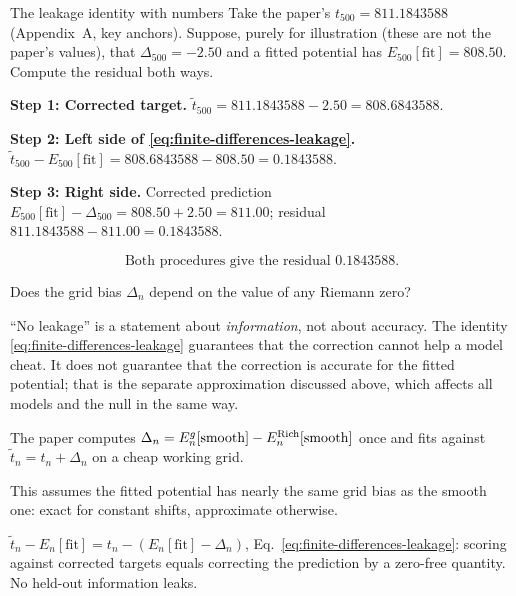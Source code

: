 \begin{sample}{The leakage identity with numbers}
Take the paper's $t_{500}=811.1843588$ (Appendix~A, key anchors). Suppose, purely for illustration (these are not the paper's values), that $\Delta_{500}=-2.50$ and a fitted potential has $E_{500}[\mathrm{fit}]=808.50$. Compute the residual both ways.

\textbf{Step 1: Corrected target.} $\tilde t_{500}=811.1843588-2.50=808.6843588$.

\textbf{Step 2: Left side of \eqref{eq:finite-differences-leakage}.} $\tilde t_{500}-E_{500}[\mathrm{fit}]=808.6843588-808.50=0.1843588$.

\textbf{Step 3: Right side.} Corrected prediction $E_{500}[\mathrm{fit}]-\Delta_{500}=808.50+2.50=811.00$; residual $811.1843588-811.00=0.1843588$.

\begin{equation*}
\boxed{\text{Both procedures give the residual }0.1843588.}
\end{equation*}
\end{sample}

\begin{checkpoint}
Does the grid bias $\Delta_n$ depend on the value of any Riemann zero?
\end{checkpoint}

\begin{pitfall}
``No leakage'' is a statement about \emph{information}, not about accuracy. The identity \eqref{eq:finite-differences-leakage} guarantees that the correction cannot help a model cheat. It does not guarantee that the correction is accurate for the fitted potential; that is the separate approximation discussed above, which affects all models and the null in the same way.
\end{pitfall}

\begin{keyideas}
\item The paper computes $\Delta_n=E^g_n[\mathrm{smooth}]-E^{\rm Rich}_n[\mathrm{smooth}]$ once and fits against $\tilde t_n=t_n+\Delta_n$ on a cheap working grid.
\item This assumes the fitted potential has nearly the same grid bias as the smooth one: exact for constant shifts, approximate otherwise.
\item $\tilde t_n-E_n[\mathrm{fit}]=t_n-(E_n[\mathrm{fit}]-\Delta_n)$, Eq.~\eqref{eq:finite-differences-leakage}: scoring against corrected targets equals correcting the prediction by a zero-free quantity. No held-out information leaks.
\end{keyideas}

